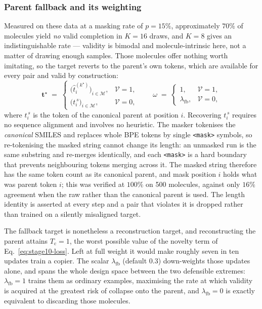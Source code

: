 \documentclass[a4paper,12pt]{article}
\begin{document}
\subsubsection{Parent fallback and its weighting}

Measured on these data at a masking rate of $p=15\%$, approximately $70\%$ of
molecules yield \emph{no} valid completion in $K=16$ draws, and $K=8$ gives an
indistinguishable rate --- validity is bimodal and molecule-intrinsic here, not
a matter of drawing enough samples. Those molecules offer nothing worth
imitating, so the target reverts to the parent's own tokens, which are available
for every pair and valid by construction:
\begin{equation}
\mathbf{t}^{\star} \;=\;
\begin{cases}
\bigl(\hat{t}^{(k^{\star})}_i\bigr)_{i \in \mathcal{M}}, & \mathcal{V}=1,\\[1ex]
\bigl(t^{\,s}_i\bigr)_{i \in \mathcal{M}}, & \mathcal{V}=0,
\end{cases}
\qquad
\omega \;=\;
\begin{cases}
1, & \mathcal{V}=1,\\[1ex]
\lambda_{\mathrm{fb}}, & \mathcal{V}=0,
\end{cases}
\label{eq:stage10-target}
\end{equation}
where $t^{\,s}_i$ is the token of the canonical parent at position $i$.
Recovering $t^{\,s}_i$ requires no sequence alignment and involves no heuristic.
The masker tokenises the \emph{canonical} SMILES and replaces whole BPE tokens
by single \texttt{<mask>} symbols, so re-tokenising the masked string cannot
change its length: an unmasked run is the same substring and re-merges
identically, and each \texttt{<mask>} is a hard boundary that prevents
neighbouring tokens merging across it. The masked string therefore has the same
token count as its canonical parent, and mask position $i$ holds what was parent
token $i$; this was verified at $100\%$ on 500 molecules, against only $16\%$
agreement when the raw rather than the canonical parent is used. The length
identity is asserted at every step and a pair that violates it is dropped rather
than trained on a silently misaligned target.

The fallback target is nonetheless a reconstruction target, and reconstructing
the parent attains $T_{\mathrm{c}}=1$, the worst possible value of the novelty
term of Eq.~\eqref{eq:stage10-loss}. Left at full weight it would make roughly
seven in ten updates train a copier. The scalar $\lambda_{\mathrm{fb}}$ (default
$0.3$) down-weights those updates alone, and spans the whole design space
between the two defensible extremes: $\lambda_{\mathrm{fb}}=1$ trains them as
ordinary examples, maximising the rate at which validity is acquired at the
greatest risk of collapse onto the parent, and $\lambda_{\mathrm{fb}}=0$ is
exactly equivalent to discarding those molecules.
\end{document}
